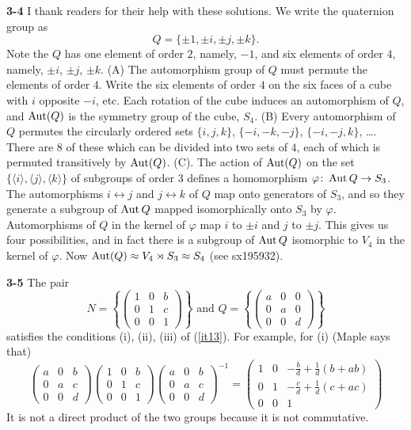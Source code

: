 \documentclass[a4paper,11pt,final]{memoir}%
\theoremstyle{nonumberplain}
\begin{document}
\bigskip\noindent\textbf{3-4}
I thank readers for their help with these solutions. We write the quaternion
group as%
\[
Q=\{\pm1,\pm i,\pm j,\pm k\}.
\]
Note the $Q$ has one element of order $2$, namely, $-1$, and six
elements of order $4$, namely, $\pm i$, $\pm j$, $\pm k$.
\noindent(A) The automorphism group of $Q$ must permute the elements of order $4$.
Write the six elements of order $4$ on the six faces
of a cube with $i$ opposite $-i$, etc. Each rotation of the cube induces an
automorphism of $Q$, and $\operatorname{Aut}(Q)$ is the symmetry group of the cube, $S_{4}$.
\noindent(B) Every automorphism
of $Q$ permutes the circularly ordered sets $\{i,j,k\}$, $\{-i,-k,-j\}$,
$\{-i,-j,k\}$, \ldots.
There are $8$ of these which can be divided into two sets of $4$,
each of which is permuted
transitively by $\operatorname{Aut}(Q)$.
\noindent(C). The action of $\operatorname{Aut}(Q)$ on the set
$\{\langle i\rangle,\langle j\rangle,\langle k\rangle\}$ of subgroups
of order $3$ defines a homomorphism $\varphi\colon\operatorname{Aut}{Q}\to S_3$.
The automorphisms $i\leftrightarrow j$ and $j\leftrightarrow k$ of $Q$
map onto generators of $S_3$, and so they generate a subgroup of $\operatorname{Aut}{Q}$
mapped isomorphically onto $S_3$ by $\varphi$.
Automorphisms of $Q$ in the kernel of $\varphi$ map $i$ to $\pm i$
and $j$ to $\pm j$. This gives us four possibilities, and in fact
there is a subgroup of $\operatorname{Aut}{Q}$  isomorphic to $V_4$ in the kernel of
$\varphi$.
Now $\operatorname{Aut}(Q)\approx V_4\rtimes S_3\approx S_4$ (see sx195932).

\bigskip\noindent\textbf{3-5}
The pair
\[
N=\left\{
\begin{pmatrix}
1 & 0 & b\\
0 & 1 & c\\
0 & 0 & 1
\end{pmatrix}
\right\}  \text{ and }Q=\left\{
\begin{pmatrix}
a & 0 & 0\\
0 & a & 0\\
0 & 0 & d
\end{pmatrix}
\right\}
\]
satisfies the conditions (i), (ii), (iii) of (\ref{it13}). For example, for
(i) (Maple says that)%
\[%
\begin{pmatrix}
a & 0 & b\\
0 & a & c\\
0 & 0 & d
\end{pmatrix}%
\begin{pmatrix}
1 & 0 & b\\
0 & 1 & c\\
0 & 0 & 1
\end{pmatrix}%
\begin{pmatrix}
a & 0 & b\\
0 & a & c\\
0 & 0 & d
\end{pmatrix}
^{-1}\allowbreak=\allowbreak%
\begin{pmatrix}
1 & 0 & -\frac{b}{d}+\frac{1}{d}\left(  b+ab\right) \\
0 & 1 & -\frac{c}{d}+\frac{1}{d}\left(  c+ac\right) \\
0 & 0 & 1
\end{pmatrix}
\]
It is not a direct product of the two groups because it is not commutative.
\end{document}
